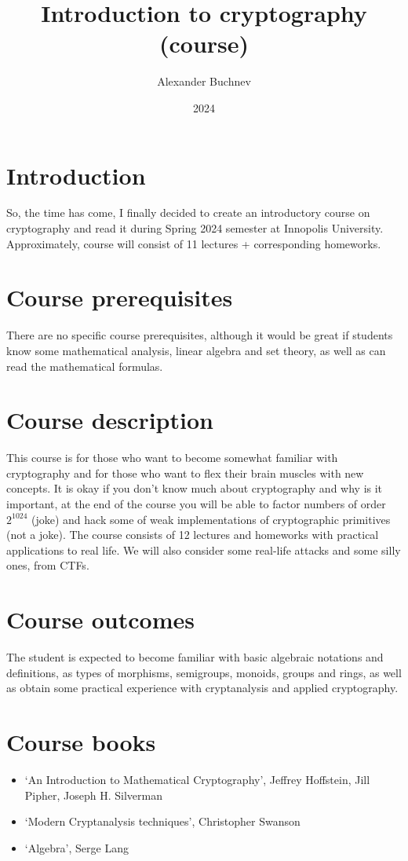 \documentclass{article}
\title{Introduction to cryptography (course)}
\author{Alexander Buchnev}
\date{2024}
\begin{document}
\maketitle

\section*{Introduction}
So, the time has come, I finally decided to create an introductory course on cryptography and read it during Spring 2024 
semester at Innopolis University. Approximately, course will consist of 11 lectures + corresponding homeworks.

\section*{Course prerequisites}
There are no specific course prerequisites, although it would be great if students know some mathematical analysis, 
linear algebra and set theory, as well as can read the mathematical formulas.

\section*{Course description}
This course is for those who want to become somewhat familiar with cryptography and for those who want to flex their 
brain muscles with new concepts. It is okay if you don't know much about cryptography and why is it important, at the 
end of the course you will be able to factor numbers of order $2^{1024}$ (joke) and hack some of weak implementations of
cryptographic primitives (not a joke). The course consists of 12 lectures and homeworks with practical applications to 
real life. We will also consider some real-life attacks and some silly ones, from CTFs. 

\section*{Course outcomes}
The student is expected to become familiar with basic algebraic notations and definitions, as types of morphisms, 
semigroups, monoids, groups and rings, as well as obtain some practical experience with cryptanalysis and applied 
cryptography. 

\section*{Course books}
\begin{itemize}
    \item `An Introduction to Mathematical Cryptography', Jeffrey Hoffstein, Jill Pipher, Joseph H. Silverman
    \item `Modern Cryptanalysis techniques', Christopher Swanson
    \item `Algebra', Serge Lang
\end{itemize}
\end{document}

